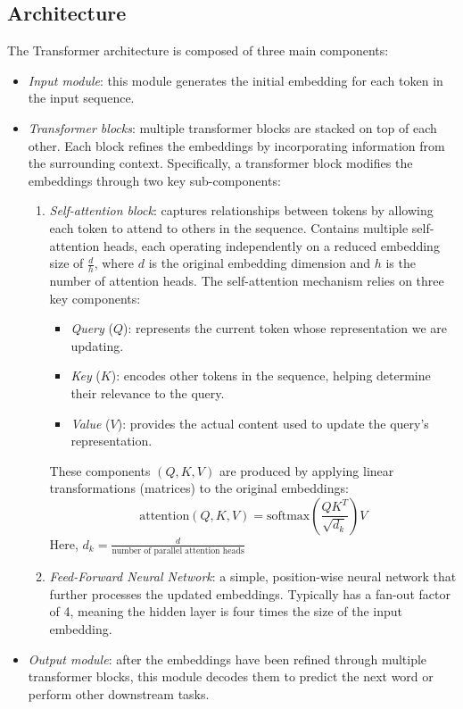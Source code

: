 \subsection{Architecture}
The Transformer architecture is composed of three main components:
\begin{itemize}
    \item \textit{Input module}: this module generates the initial embedding for each token in the input sequence.
    \item \textit{Transformer blocks}: multiple transformer blocks are stacked on top of each other. Each block refines the embeddings by incorporating information from the surrounding context.
        Specifically, a transformer block modifies the embeddings through two key sub-components:
        \begin{enumerate}
            \item \textit{Self-attention block}: captures relationships between tokens by allowing each token to attend to others in the sequence.
            Contains multiple self-attention heads, each operating independently on a reduced embedding size of $\frac{d}{h}$, where $d$ is the original embedding dimension and $h$ is the number of attention heads.
            The self-attention mechanism relies on three key components:
            \begin{itemize}
                \item \textit{Query} ($Q$): represents the current token whose representation we are updating.
                \item \textit{Key} ($K$): encodes other tokens in the sequence, helping determine their relevance to the query.
                \item \textit{Value} ($V$): provides the actual content used to update the query's representation.
            \end{itemize}
            These components $(Q,K,V)$ are produced by applying linear transformations (matrices) to the original embeddings: 
            \[\text{attention}(Q,K,V)=\text{softmax}\left(\dfrac{QK^T}{\sqrt{d_k}}\right)V\]
            Here, $d_k=\frac{d}{\text{number of parallel attention heads}}$
            \item \textit{Feed-Forward Neural Network}: a simple, position-wise neural network that further processes the updated embeddings.
                Typically has a fan-out factor of 4, meaning the hidden layer is four times the size of the input embedding.
        \end{enumerate}
    \item \textit{Output module}: after the embeddings have been refined through multiple transformer blocks, this module decodes them to predict the next word or perform other downstream tasks.
\end{itemize}

